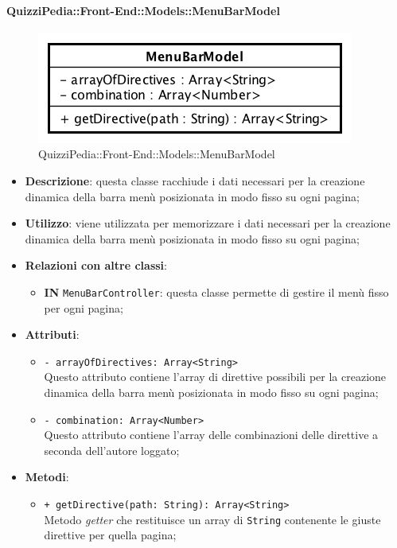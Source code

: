 \paragraph{QuizziPedia::Front-End::Models::MenuBarModel}
		
		\label{QuizziPedia::Front-End::Models::MenuBarModel}
		
		\begin{figure}[ht]
			\centering
			\includegraphics[scale=0.5,keepaspectratio]{UML/Classi/Front-End/QuizziPedia_Front-end_Models_MenuBarModel.png}
			\caption{QuizziPedia::Front-End::Models::MenuBarModel}
		\end{figure} \FloatBarrier
		
		\begin{itemize}
			\item \textbf{Descrizione}: questa classe racchiude i dati necessari per la creazione dinamica della barra menù posizionata in modo fisso su ogni pagina;
			\item \textbf{Utilizzo}: viene utilizzata per memorizzare i dati necessari per la creazione dinamica della barra menù posizionata in modo fisso su ogni pagina;
			\item \textbf{Relazioni con altre classi}: 
			\begin{itemize}
				\item \textbf{IN} \texttt{MenuBarController}: questa classe permette di gestire il menù fisso per ogni pagina;
			\end{itemize}
			\item \textbf{Attributi}: 
			\begin{itemize}
				\item \texttt{- arrayOfDirectives: Array<String>}\\
				Questo attributo contiene l'array di direttive possibili per la creazione dinamica della barra menù posizionata in modo fisso su ogni pagina;
			\end{itemize}
			\begin{itemize}
				\item \texttt{- combination: Array<Number>}\\
				Questo attributo contiene l'array delle combinazioni delle direttive a seconda dell'autore loggato;
			\end{itemize}
			\item \textbf{Metodi}: 
			\begin{itemize}
				\item \texttt{+ getDirective(path: String): Array<String>} \\
				Metodo \textit{getter} che restituisce un array di \texttt{String} contenente le giuste direttive per quella pagina;
			\end{itemize}
		\end{itemize}		
		
		
		